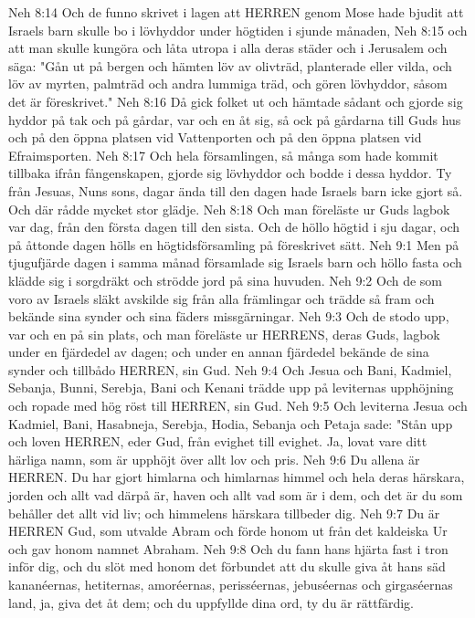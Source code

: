 Neh 8:14  Och de funno skrivet i lagen att HERREN genom Mose hade bjudit att Israels barn skulle bo i lövhyddor under högtiden i sjunde månaden,
Neh 8:15  och att man skulle kungöra och låta utropa i alla deras städer och i Jerusalem och säga: "Gån ut på bergen och hämten löv av olivträd, planterade eller vilda, och löv av myrten, palmträd och andra lummiga träd, och gören lövhyddor, såsom det är föreskrivet."
Neh 8:16  Då gick folket ut och hämtade sådant och gjorde sig hyddor på tak och på gårdar, var och en åt sig, så ock på gårdarna till Guds hus och på den öppna platsen vid Vattenporten och på den öppna platsen vid Efraimsporten.
Neh 8:17  Och hela församlingen, så många som hade kommit tillbaka ifrån fångenskapen, gjorde sig lövhyddor och bodde i dessa hyddor. Ty från Jesuas, Nuns sons, dagar ända till den dagen hade Israels barn icke gjort så. Och där rådde mycket stor glädje.
Neh 8:18  Och man föreläste ur Guds lagbok var dag, från den första dagen till den sista. Och de höllo högtid i sju dagar, och på åttonde dagen hölls en högtidsförsamling på föreskrivet sätt.
Neh 9:1  Men på tjugufjärde dagen i samma månad församlade sig Israels barn och höllo fasta och klädde sig i sorgdräkt och strödde jord på sina huvuden.
Neh 9:2  Och de som voro av Israels släkt avskilde sig från alla främlingar och trädde så fram och bekände sina synder och sina fäders missgärningar.
Neh 9:3  Och de stodo upp, var och en på sin plats, och man föreläste ur HERRENS, deras Guds, lagbok under en fjärdedel av dagen; och under en annan fjärdedel bekände de sina synder och tillbådo HERREN, sin Gud.
Neh 9:4  Och Jesua och Bani, Kadmiel, Sebanja, Bunni, Serebja, Bani och Kenani trädde upp på leviternas upphöjning och ropade med hög röst till HERREN, sin Gud.
Neh 9:5  Och leviterna Jesua och Kadmiel, Bani, Hasabneja, Serebja, Hodia, Sebanja och Petaja sade: "Stån upp och loven HERREN, eder Gud, från evighet till evighet. Ja, lovat vare ditt härliga namn, som är upphöjt över allt lov och pris.
Neh 9:6  Du allena är HERREN. Du har gjort himlarna och himlarnas himmel och hela deras härskara, jorden och allt vad därpå är, haven och allt vad som är i dem, och det är du som behåller det allt vid liv; och himmelens härskara tillbeder dig.
Neh 9:7  Du är HERREN Gud, som utvalde Abram och förde honom ut från det kaldeiska Ur och gav honom namnet Abraham.
Neh 9:8  Och du fann hans hjärta fast i tron inför dig, och du slöt med honom det förbundet att du skulle giva åt hans säd kananéernas, hetiternas, amoréernas, perisséernas, jebuséernas och girgaséernas land, ja, giva det åt dem; och du uppfyllde dina ord, ty du är rättfärdig.
